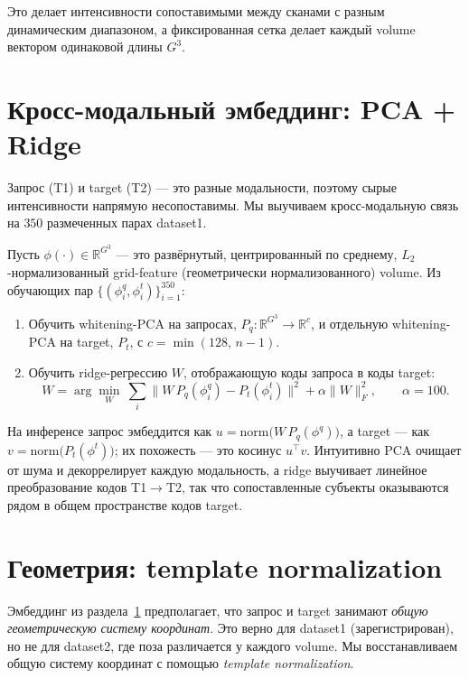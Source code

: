 \documentclass[11pt]{article}
\newcommand{\R}{\mathbb{R}}
\begin{document}
Это делает интенсивности сопоставимыми между сканами с разным динамическим диапазоном,
а фиксированная сетка делает каждый volume вектором одинаковой длины $G^3$.

\section{Кросс-модальный эмбеддинг: PCA + Ridge}\label{sec:embed}

Запрос (T1) и target (T2) — это разные модальности, поэтому сырые интенсивности
напрямую несопоставимы. Мы выучиваем кросс-модальную связь на $350$ размеченных
парах dataset1.

Пусть $\phi(\cdot)\in\R^{G^3}$ — это развёрнутый, центрированный по среднему,
$L_2$-нормализованный grid-feature (геометрически нормализованного) volume. Из обучающих
пар $\{(\phi^q_i,\phi^t_i)\}_{i=1}^{350}$:

\begin{enumerate}[nosep]
  \item Обучить whitening-PCA на запросах, $P_q:\R^{G^3}\!\to\R^{c}$, и отдельную
        whitening-PCA на target, $P_t$, с $c=\min(128,\,n-1)$.
  \item Обучить ridge-регрессию $W$, отображающую коды запроса в коды target:
        \begin{equation}
          W=\arg\min_{W}\ \sum_i \big\|W\,P_q(\phi^q_i)-P_t(\phi^t_i)\big\|^2
          +\alpha\|W\|_F^2,\qquad \alpha=100 .
        \end{equation}
\end{enumerate}

На инференсе запрос эмбеддится как $u = \mathrm{norm}\!\big(W\,P_q(\phi^q)\big)$, а
target — как $v = \mathrm{norm}\!\big(P_t(\phi^t)\big)$; их похожесть — это косинус
$u^\top v$. Интуитивно PCA очищает от шума и декоррелирует каждую модальность, а ridge
выучивает линейное преобразование кодов T1$\to$T2, так что сопоставленные субъекты
оказываются рядом в общем пространстве кодов target.

\section{Геометрия: template normalization}\label{sec:template}

Эмбеддинг из раздела~\ref{sec:embed} предполагает, что запрос и target занимают
\emph{общую геометрическую систему координат}. Это верно для dataset1
(зарегистрирован), но не для dataset2, где поза различается у каждого volume. Мы
восстанавливаем общую систему координат с помощью \emph{template normalization}.
\end{document}
